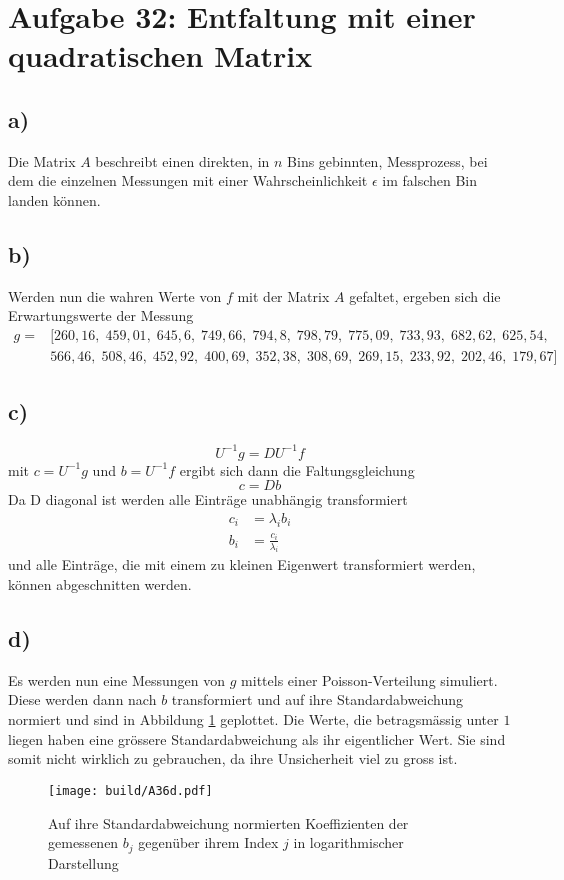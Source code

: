 \section*{Aufgabe 32: Entfaltung mit einer quadratischen Matrix}
\label{sec:Aufgabe4}
\subsection*{a)}
Die Matrix ${A}$ beschreibt einen direkten, in $n$ Bins gebinnten, Messprozess,
bei dem die einzelnen Messungen mit einer Wahrscheinlichkeit $\epsilon$ im falschen Bin landen können.

\subsection*{b)}
Werden nun die wahren Werte von ${f}$ mit der Matrix ${A}$ gefaltet, ergeben sich die Erwartungswerte der Messung
\begin{align}
    {g} = &[260,16,\; 459,01,\; 645,6,\; 749,66,\; 794,8,\;  798,79,\; 775,09,\; 733,93,\; 682,62,\; 625,54,\nonumber\\
        &566,46,\; 508,46,\; 452,92,\; 400,69,\; 352,38,\; 308,69,\; 269,15,\; 233,92,\; 202,46,\; 179,67]
\end{align}

\subsection*{c)}
\begin{equation}
    U^{-1} g = D U^{-1} f
\end{equation}
mit $c=U^{-1} g$ und $b=U^{-1} f$ ergibt sich dann die Faltungsgleichung
\begin{equation}
    c = D b
\end{equation}
Da D diagonal ist werden alle Einträge unabhängig transformiert
\begin{align}
    c_i &= \lambda_i b_i\\
    b_i &= \frac{c_i}{\lambda_i}
\end{align}
und alle Einträge, die mit einem zu kleinen Eigenwert transformiert werden, können abgeschnitten werden.

\subsection*{d)}
Es werden nun eine Messungen von $g$ mittels einer Poisson-Verteilung simuliert.
Diese werden dann nach $b$ transformiert und auf ihre Standardabweichung normiert und sind in Abbildung \ref{fig:A36d} geplottet.
Die Werte, die betragsmässig unter $1$ liegen haben eine grössere Standardabweichung als ihr eigentlicher Wert.
Sie sind somit nicht wirklich zu gebrauchen, da ihre Unsicherheit viel zu gross ist.
\begin{figure}
    \centering
    \texttt{[image: build/A36d.pdf]}
    \caption{Auf ihre Standardabweichung normierten Koeffizienten der gemessenen $b_j$ gegenüber ihrem Index $j$ in logarithmischer Darstellung}
    \label{fig:A36d}
\end{figure}


